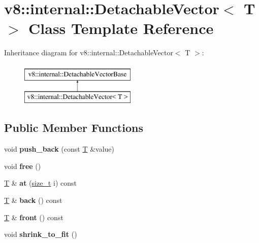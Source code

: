 \hypertarget{classv8_1_1internal_1_1DetachableVector}{}\section{v8\+:\+:internal\+:\+:Detachable\+Vector$<$ T $>$ Class Template Reference}
\label{classv8_1_1internal_1_1DetachableVector}
Inheritance diagram for v8\+:\+:internal\+:\+:Detachable\+Vector$<$ T $>$\+:\begin{figure}[H]
\begin{center}
\leavevmode
\includegraphics[height=2.000000cm]{classv8_1_1internal_1_1DetachableVector}
\end{center}
\end{figure}
\subsection*{Public Member Functions}
\begin{DoxyCompactItemize}
\item 
\mbox{\label{classv8_1_1internal_1_1DetachableVector_a9513dadebf6c33301d039f0c86d62cd8}} 
void {\bfseries push\+\_\+back} (const \mbox{\hyperlink{classv8_1_1internal_1_1torque_1_1T}{T}} \&value)
\item 
\mbox{\label{classv8_1_1internal_1_1DetachableVector_a7efbe6a917324ad09fa13ae77051711f}} 
void {\bfseries free} ()
\item 
\mbox{\label{classv8_1_1internal_1_1DetachableVector_a24306fe1e4a2582dfbb22ce3d521ce86}} 
\mbox{\hyperlink{classv8_1_1internal_1_1torque_1_1T}{T}} \& {\bfseries at} (\mbox{\hyperlink{classsize__t}{size\+\_\+t}} i) const
\item 
\mbox{\label{classv8_1_1internal_1_1DetachableVector_a639e31ae9eb5e5d75eab1a3fb9a5de92}} 
\mbox{\hyperlink{classv8_1_1internal_1_1torque_1_1T}{T}} \& {\bfseries back} () const
\item 
\mbox{\label{classv8_1_1internal_1_1DetachableVector_a93ba91f4a5f237a27e54565f25f8703b}} 
\mbox{\hyperlink{classv8_1_1internal_1_1torque_1_1T}{T}} \& {\bfseries front} () const
\item 
\mbox{\label{classv8_1_1internal_1_1DetachableVector_a4642235a98aaa3b2a43a43e0d5b6a89c}} 
void {\bfseries shrink\+\_\+to\+\_\+fit} ()
\end{DoxyCompactItemize}

